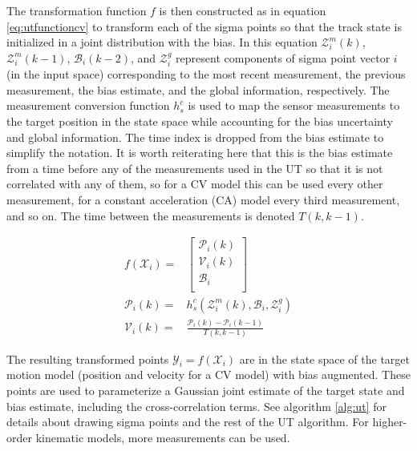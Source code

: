 \documentclass[journal]{IEEEtran}
\begin{document}
The transformation function $f$ is then constructed as in equation \ref{eq:utfunctioncv} to transform each of the sigma points so that the track state is initialized in a joint distribution with the bias. In this equation $\mathcal{Z}_i^m(k)$, $\mathcal{Z}_i^m(k-1)$, $\mathcal{B}_i(k-2)$, and $\mathcal{Z}_i^g$ represent components of sigma point vector $i$ (in the input space) corresponding to the most recent measurement, the previous measurement, the bias estimate, and the global information, respectively. The measurement conversion function $h_{s}^{c}$ is used to map the sensor measurements to the target position in the state space while accounting for the bias uncertainty and global information. The time index is dropped from the bias estimate to simplify the notation. It is worth reiterating here that this is the bias estimate from a time before any of the measurements used in the UT so that it is not correlated with any of them, so for a CV model this can be used every other measurement, for a constant acceleration (CA) model every third measurement, and so on. The time between the measurements is denoted $T(k, k-1)$.

\begin{equation}
\begin{aligned}
    f(\mathcal{X}_i) ={}& \begin{bmatrix}
                        \mathcal{P}_i(k) \\
                        \mathcal{V}_i(k) \\
                        \mathcal{B}_i \\
                    \end{bmatrix} \\
    \mathcal{P}_i(k) ={}& h_{s}^{c}( \mathcal{Z}_i^m(k), \mathcal{B}_i, \mathcal{Z}_i^g ) \\
    \mathcal{V}_i(k) ={}& \frac{ \mathcal{P}_i(k) - \mathcal{P}_i(k-1)}{ T(k, k-1) }
\end{aligned} \label{eq:utfunctioncv}
\end{equation}

The resulting transformed points $\mathcal{Y}_i = f(\mathcal{X}_i)$ are in the state space of the target motion model (position and velocity for a CV model) with bias augmented. These points are used to parameterize a Gaussian joint estimate of the target state and bias estimate, including the cross-correlation terms. See algorithm \ref{alg:ut} for details about drawing sigma points and the rest of the UT algorithm. For higher-order kinematic models, more measurements can be used.
\end{document}
